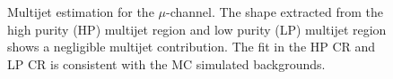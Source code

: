 \begin{figure}[htb]
\caption[Multijet estimation for the muon channel]{Multijet estimation for the $\mu$-channel. The shape extracted from the \protect{} high purity (HP) multijet region and \protect{} low purity (LP) multijet region shows a negligible multijet contribution. The fit in the \Wjets \protect{} HP CR and \protect{} LP CR is consistent with the MC simulated backgrounds.}
\label{fig:qcdshape_fit_mu}
\end{figure}	

